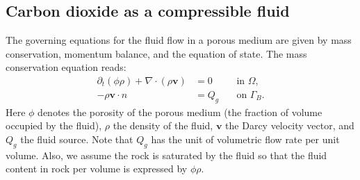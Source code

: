 
\subsection{Carbon dioxide as a compressible fluid} \label{Sec:CO2}
The governing equations for the fluid flow in a porous medium are given by mass conservation, momentum balance, and the equation of state.
The mass conservation equation reads:
\begin{equation}\label{Eq:Mass_Conserv}
\begin{aligned}
\partial_t\left(\phi\rho\right)+\nabla\cdot\left(\rho{\bm{v}}\right)&=0  \quad  &\text{in~} \Omega, \\
-\rho{\bm{v}} \cdot n &=Q_g  \quad  &\text{on~} \Gamma_B.       
\end{aligned}
\end{equation}
Here $\phi$ denotes the porosity of the porous medium (the fraction of volume occupied by the fluid), $\rho$ the density of the fluid, {$\bm{v}$} the Darcy velocity vector, and $Q_g$ the fluid source. Note that $Q_g$ has the unit of volumetric flow rate per unit volume. Also, we assume the rock is saturated by the fluid so that the fluid content in rock per volume is expressed by $\phi\rho$.


